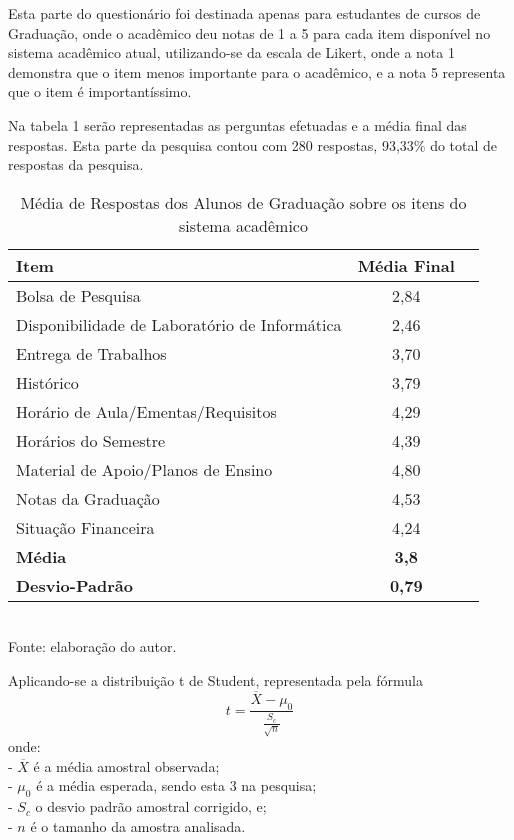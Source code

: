 Esta parte do questionário foi destinada apenas para estudantes de cursos de Graduação, onde o acadêmico deu notas de 1 a 5 para cada item disponível no sistema acadêmico atual, utilizando-se da escala de Likert, onde  a nota 1 demonstra que o item menos importante para o acadêmico, e a nota 5 representa que o item é importantíssimo.

Na tabela 1 serão representadas as perguntas efetuadas e a média final das respostas. Esta parte da pesquisa contou com 280 respostas, 93,33\% do total de respostas da pesquisa.
\begin{table}[!hbt]
\centering
\caption[Média de Respostas dos Alunos de Graduação]{Média de Respostas dos Alunos de Graduação sobre os itens do sistema acadêmico}
\vspace{3mm}
\begin{tabular}{|p{9.5cm}|c|c|}\hline
\textbf{Item} & \textbf{Média Final} \\ \hline
Bolsa de Pesquisa & 2,84 \\ \hline
Disponibilidade de Laboratório de Informática & 2,46 \\ \hline
Entrega de Trabalhos & 3,70 \\ \hline
Histórico & 3,79 \\ \hline
Horário de Aula/Ementas/Requisitos & 4,29 \\ \hline
Horários do Semestre & 4,39 \\ \hline
Material de Apoio/Planos de Ensino & 4,80 \\ \hline
Notas da Graduação & 4,53 \\ \hline
Situação Financeira & 4,24 \\ \hline
\textbf{Média} & \textbf{3,8} \\ \hline
\textbf{Desvio-Padrão} & \textbf{0,79} \\ \hline
\end{tabular}
\\ Fonte: elaboração do autor.
\end{table}

Aplicando-se a distribuição t de Student, representada pela fórmula 
\[
t=\frac{{\overline{X}} - \mu_0}
{\frac{S_c}{\sqrt{n}}}
\]
onde:\\ 
- $\overline{X}$ é a média amostral observada; \\
- $\mu_0$ é a média esperada, sendo esta 3 na pesquisa; \\
- $S_c$ o desvio padrão amostral corrigido, e; \\
- $n$ é o tamanho da amostra analisada.

